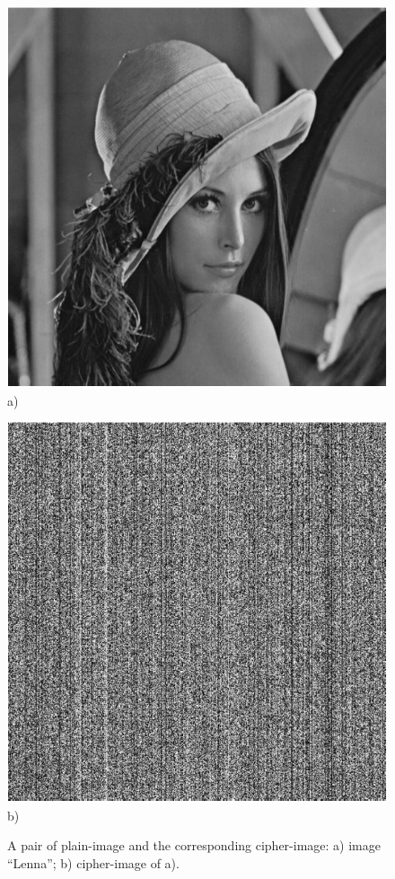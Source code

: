 \begin{figure}[!htb]
\centering
\begin{minipage}[t]{\imagewidth}
\centering
\includegraphics[width=\imagewidth]{Lenna}
a)
\end{minipage} \hspace{4pt}
\begin{minipage}[t]{\imagewidth}
\centering
\includegraphics[width=\imagewidth]{Lenna_e}
b)
\end{minipage}
\caption{A pair of plain-image and the corresponding cipher-image:
a) image ``Lenna''; b) cipher-image of a).}
\label{fig:APairPlaintext}
\end{figure}

